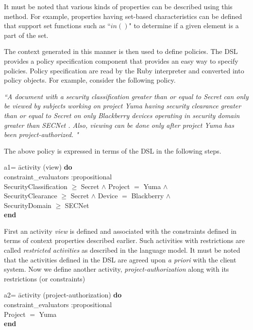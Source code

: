 It must be noted that various kinds of properties can be described using this method. For example, properties having set-based characteristics can be defined that support set functions such as ``$in()$" to determine if a given element is a part of the set. 

The context generated in this manner is then used to define policies. The DSL provides a policy specification component that provides an easy way to specify policies. Policy specification are read by the Ruby interpreter and converted into policy objects. For example, consider the following policy. 

{\em ``A document with a security classification greater than or equal to Secret can only be viewed by subjects working on project Yuma having security clearance greater than or equal to Secret on only Blackberry devices operating in security domain greater than SECNet . Also, viewing can be done only after project Yuma has been project-authorized. "}

The above policy is expressed in terms of the DSL in the following steps. 

\begin{tabbing}
a1= \= activity (view) {\bf do} \\
\>	constraint\_evaluators :propositional\\
\>	SecurityClassification $\geq$ Secret $\wedge$ Project $=$ Yuma $\wedge$\\
\>	SecurityClearance $\geq$ Secret $\wedge$  Device $=$ Blackberry $\wedge$ \\
\>	SecurityDomain $\geq$ SECNet \\
{\bf end}
\end{tabbing}

First an activity {\em view} is defined and associated with the constraints defined in terms of context properties described earlier. Such activities with restrictions are called {\em restricted activities} as described in the language model. It must be noted that the activities defined in the DSL are agreed upon {\em a priori} with the client system. Now we define another activity, {\em project-authorization} along with its restrictions (or constraints)

\begin{tabbing}
a2= \= activity (project-authorization) {\bf do} \\
\>	constraint\_evaluators :propositional\\
\>	 Project $=$ Yuma \\
{\bf end}
\end{tabbing}

